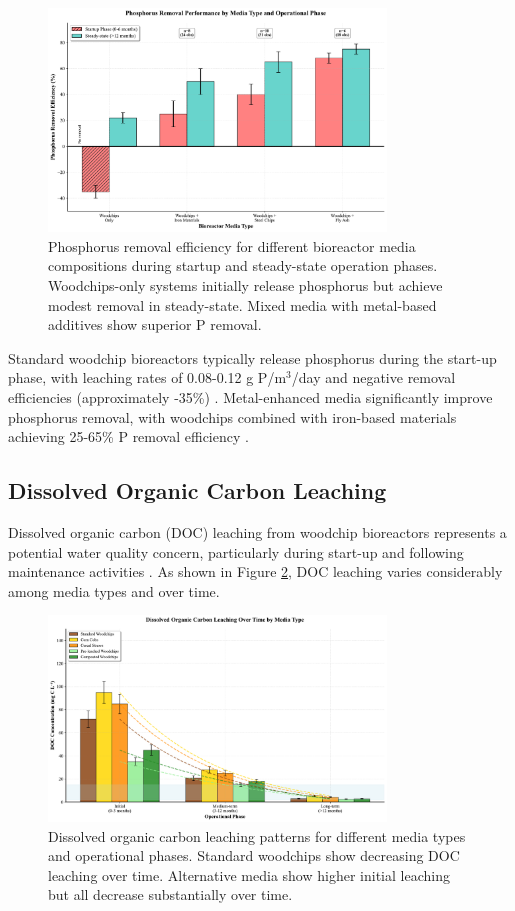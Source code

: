\documentclass[12pt,a4paper]{article}
\begin{document}
\begin{figure}[H]
\centering
\includegraphics[width=0.8\textwidth]{fig7_phosphorus_scientific}
\caption{Phosphorus removal efficiency for different bioreactor media compositions during startup and steady-state operation phases. Woodchips-only systems initially release phosphorus but achieve modest removal in steady-state. Mixed media with metal-based additives show superior P removal.}
\label{fig:phosphorus_removal}
\end{figure}

Standard woodchip bioreactors typically release phosphorus during the start-up phase, with leaching rates of 0.08-0.12 g P/m$^3$/day and negative removal efficiencies (approximately -35\%) \citep{RN291}. Metal-enhanced media significantly improve phosphorus removal, with woodchips combined with iron-based materials achieving 25-65\% P removal efficiency \citep{RN370}.

\subsection{Dissolved Organic Carbon Leaching}

Dissolved organic carbon (DOC) leaching from woodchip bioreactors represents a potential water quality concern, particularly during start-up and following maintenance activities \citep{RN291, RN242}. As shown in Figure \ref{fig:doc_leaching}, DOC leaching varies considerably among media types and over time.

\begin{figure}[H]
\centering
\includegraphics[width=0.8\textwidth]{fig8_doc_leaching_scientific}
\caption{Dissolved organic carbon leaching patterns for different media types and operational phases. Standard woodchips show decreasing DOC leaching over time. Alternative media show higher initial leaching but all decrease substantially over time.}
\label{fig:doc_leaching}
\end{figure}
\end{document}

